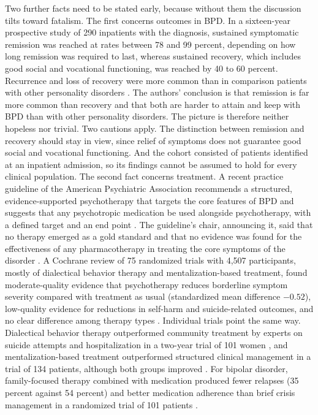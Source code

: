 \documentclass[11pt]{article}
\theoremstyle{definition}
\theoremstyle{remark}
\begin{document}
Two further facts need to be stated early, because without them the discussion tilts toward fatalism. The first concerns outcomes in BPD. In a sixteen-year prospective study of 290 inpatients with the diagnosis, sustained symptomatic remission was reached at rates between 78 and 99 percent, depending on how long remission was required to last, whereas sustained recovery, which includes good social and vocational functioning, was reached by 40 to 60 percent. Recurrence and loss of recovery were more common than in comparison patients with other personality disorders \citep{zanarini2012}. The authors' conclusion is that remission is far more common than recovery and that both are harder to attain and keep with BPD than with other personality disorders. The picture is therefore neither hopeless nor trivial. Two cautions apply. The distinction between remission and recovery should stay in view, since relief of symptoms does not guarantee good social and vocational functioning. And the cohort consisted of patients identified at an inpatient admission, so its findings cannot be assumed to hold for every clinical population. The second fact concerns treatment. A recent practice guideline of the American Psychiatric Association recommends a structured, evidence-supported psychotherapy that targets the core features of BPD and suggests that any psychotropic medication be used alongside psychotherapy, with a defined target and an end point \citep{apa2024}. The guideline's chair, announcing it, said that no therapy emerged as a gold standard and that no evidence was found for the effectiveness of any pharmacotherapy in treating the core symptoms of the disorder \citep{apanews2024}. A Cochrane review of 75 randomized trials with 4,507 participants, mostly of dialectical behavior therapy and mentalization-based treatment, found moderate-quality evidence that psychotherapy reduces borderline symptom severity compared with treatment as usual (standardized mean difference $-0.52$), low-quality evidence for reductions in self-harm and suicide-related outcomes, and no clear difference among therapy types \citep{storebo2020}. Individual trials point the same way. Dialectical behavior therapy outperformed community treatment by experts on suicide attempts and hospitalization in a two-year trial of 101 women \citep{linehan2006}, and mentalization-based treatment outperformed structured clinical management in a trial of 134 patients, although both groups improved \citep{bateman2009}. For bipolar disorder, family-focused therapy combined with medication produced fewer relapses (35 percent against 54 percent) and better medication adherence than brief crisis management in a randomized trial of 101 patients \citep{miklowitz2003}.
\end{document}
